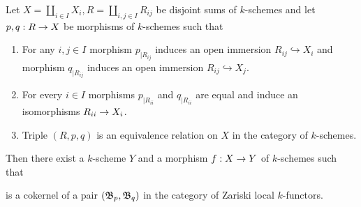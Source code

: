 \begin{lemma}\label{lemma:recollement}
Let $X = \coprod_{i\in I}X_i, R = \coprod_{i,j\in I}R_{ij}$ be disjoint sums of $k$-schemes and let $p,q:R\rightarrow X$ be morphisms of $k$-schemes such that
\begin{enumerate}[label=\emph{\textbf{(\arabic*)}}, leftmargin=1.5em]
\item For any $i,j\in I$ morphism $p_{\mid R_{ij}}$ induces an open immersion $R_{ij}\hookrightarrow X_i$ and morphism $q_{\mid R_{ij}}$ induces an open immersion $R_{ij}\hookrightarrow X_j$.
\item For every $i\in I$ morphisms $p_{\mid R_{ii}}$ and $q_{\mid R_{ii}}$ are equal and induce an isomorphisms $R_{ii}\rightarrow X_i$.  
\item Triple $\left(R,p,q\right)$ is an equivalence relation on $X$ in the category of $k$-schemes.
\end{enumerate}
Then there exist a $k$-scheme $Y$ and a morphism $f:X\rightarrow Y$ of $k$-schemes such that
\begin{center}
\end{center}
is a cokernel of a pair $({\mathfrak B}_{p},{\mathfrak B}_{q})$ in the category of Zariski local $k$-functors.
\end{lemma}
